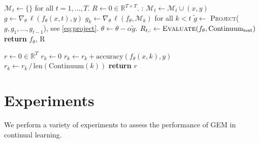 \documentclass{article}
\begin{document}
\begin{algorithm}
    \caption{Training a GEM over an \emph{ordered} continuum of data}
    \label{alg:gem:train}
    \begin{minipage}[t]{.5\linewidth}
    \begin{algorithmic}
    \small
        \State $\mathcal{M}_t \leftarrow \lbrace\rbrace$ for all $t = 1, \ldots, T$.
        \State $R \leftarrow 0 \in \mathbb{R}^{T\times T}$. 
        :
            \State $\mathcal{M}_t \leftarrow \mathcal{M}_t \cup (x,y)$
            \State $g \leftarrow \nabla_\theta \, \ell (f_\theta(x, t), y)$
            \State $g_{k} \leftarrow \nabla_\theta \, \ell (f_\theta, \mathcal{M}_{k})$ for all
                $k < t$ 
            \State $\tilde{g} \leftarrow$ \textsc{Project}($g, g_1, \ldots, g_{t-1}$), see \eqref{eq:project}.
            \State $\theta \leftarrow \theta - \alpha \tilde{g}$.
        \EndFor
        \State $R_{t,:} \leftarrow \textsc{Evaluate}(f_\theta, \text{Continuum}_{\text{test}})$
        \EndFor
        \State \textbf{return} $f_\theta$, R
    \EndProcedure
    \end{algorithmic}
    \end{minipage}
    \hfill
    \begin{minipage}[t]{.4\linewidth}
    \begin{algorithmic}
    \small
        \State $r \leftarrow 0 \in \mathbb{R}^T$
        \State $r_k \leftarrow 0$
            \State $r_k \leftarrow r_k +  \mbox{accuracy}(f_\theta(x, k), y)$
        \EndFor
        \State $r_k \leftarrow r_k \,/\, \text{len}(\text{Continuum}(k))$
        \EndFor
        \State \textbf{return} $r$
    \EndProcedure
    \end{algorithmic}
    \end{minipage}
\end{algorithm}

\section{Experiments}\label{sec:experiments}
We perform a variety of experiments to assess the
performance of GEM in continual learning.
\end{document}
